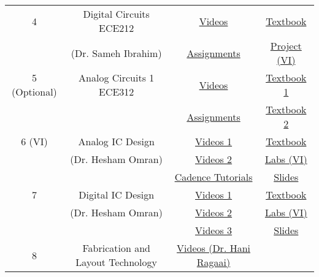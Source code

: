 \documentclass{article}
\begin{document}
\begin{table}[H]
{\begin{tabular}{|c|c|c|c|}
            4& Digital Circuits ECE212& \href{https://youtube.com/playlist?list=PLffO0PKa_AqF3fy9YwNolJS6L2ihBfS2M}{Videos}& \href{https://drive.google.com/file/d/1-clLoEkncZoUtc61PNqQZfctg7kJ0UlC/view}{Textbook}\\ 
            & (Dr. Sameh Ibrahim)& \href{https://drive.google.com/drive/folders/1weSIhUowqP4sE5Lw5QbcLAbCg0UWZ5wu}{Assignments}& \href{https://drive.google.com/drive/folders/1zFoMl3GUZ5zjXTTB8ewB1TrqjpDIzaeT}{Project (VI)}\\\hline
            5 (Optional)& Analog Circuits 1 ECE312& \href{https://youtube.com/playlist?list=PLn8yg3bTmnBMdiTGosHI70OwqAnPBHihw}{Videos}& \href{https://drive.google.com/file/d/10is26spc5RwzQR5jrTpewhjWqASddQNW/view?usp=share_link}{Textbook 1}\\ 
            & & \href{https://drive.google.com/drive/folders/18ZbDrZpIOLye5G4EQudCCWs9w7BnTCnl}{Assignments}& \href{https://drive.google.com/file/d/10jptwIjZyKZucCfCkCYNZDeIluk5ocQV/view}{Textbook 2}\\ \hline
            6 (VI)& Analog IC Design& \href{https://youtube.com/playlist?list=PLMSBalys69yzp1vrmnYAmpRFiptbuGuaj}{Videos 1}& \href{https://drive.google.com/file/d/10jptwIjZyKZucCfCkCYNZDeIluk5ocQV/view}{Textbook}\\ 
            & (Dr. Hesham Omran)& \href{https://youtube.com/playlist?list=PLMSBalys69yxQrKE_46AYuFkthIBh-WVJ}{Videos 2}& \href{https://drive.google.com/drive/folders/1bVQrHuBM_Zyx9GM0jdYwGqFmFIBjb9Fk}{Labs (VI)}\\ 
            & & \href{https://www.youtube.com/playlist?list=PLMSBalys69yza1LVr3JNc6_pnYW4CvlEb}{Cadence Tutorials}& \href{https://drive.google.com/drive/folders/1OWcbg8f48_ilr8jptdFEA3nbNeQyD0Hi}{Slides}\\ \hline
            7& Digital IC Design& \href{https://youtube.com/playlist?list=PLMSBalys69yzvAKErDt7tT7O-iIKPlOCP}{Videos 1}& \href{https://drive.google.com/file/d/1C_oqeYZtKoPknInQSXJIiyK8JTdP08Bv/view?usp=share_link}{Textbook}\\ 
            & (Dr. Hesham Omran)& \href{https://youtube.com/playlist?list=PLMSBalys69yxoIjeZ2Q3fxs69cGCU14B1}{Videos 2}& \href{https://drive.google.com/drive/folders/13qOhwyrNFEtWz1WIS5ePWHmnr6po2SjQ}{Labs (VI)}\\ 
            & & \href{https://youtube.com/playlist?list=PLMSBalys69yw1tSoF42QW9jbbC0-UeCAy}{Videos 3}& \href{https://drive.google.com/drive/folders/1M5aUzLXa6l-Hi-CttAiizFCSNZoZwVvX}{Slides}\\ \hline
            8& Fabrication and Layout Technology& \href{https://youtube.com/playlist?list=PLrwcpgRKGrGdKRANVeezRtCxLIjTVA0-9}{Videos (Dr. Hani Ragaai)}& \\ 

\end{tabular}}
\end{table}
\end{document}
